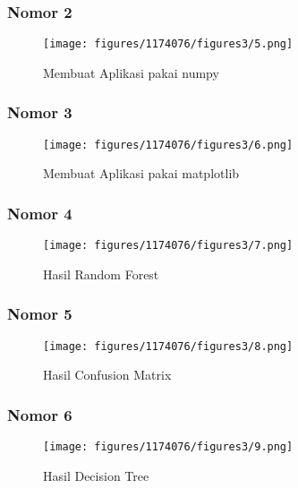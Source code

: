 \subsubsection{Nomor 2}
\hfill\break

\begin{figure}[H]
\centerline{\texttt{[image: figures/1174076/figures3/5.png]}}
\caption{Membuat Aplikasi pakai numpy}
\label{labelgambar}
\end{figure}

\subsubsection{Nomor 3}
\hfill\break

\begin{figure}[H]
\centerline{\texttt{[image: figures/1174076/figures3/6.png]}}
\caption{Membuat Aplikasi pakai matplotlib}
\label{labelgambar}
\end{figure}

\subsubsection{Nomor 4}
\hfill\break

\begin{figure}[H]
\centerline{\texttt{[image: figures/1174076/figures3/7.png]}}
\caption{Hasil Random Forest}
\label{labelgambar}
\end{figure}

\subsubsection{Nomor 5}
\hfill\break

\begin{figure}[H]
\centerline{\texttt{[image: figures/1174076/figures3/8.png]}}
\caption{Hasil Confusion Matrix}
\label{labelgambar}
\end{figure}

\subsubsection{Nomor 6}
\hfill\break

\begin{figure}[H]
\centerline{\texttt{[image: figures/1174076/figures3/9.png]}}
\caption{Hasil Decision Tree}
\label{labelgambar}
\end{figure}

